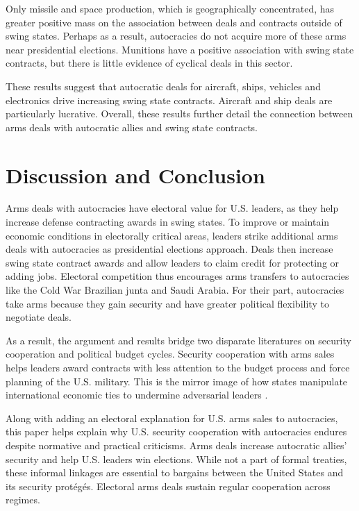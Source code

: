 \documentclass[12pt]{article}
\begin{document}
Only missile and space production, which is geographically concentrated, has greater positive mass on the association between deals and contracts outside of swing states. 
Perhaps as a result, autocracies do not acquire more of these arms near presidential elections. 
Munitions have a positive association with swing state contracts, but there is little evidence of cyclical deals in this sector. 


These results suggest that autocratic deals for aircraft, ships, vehicles and electronics drive increasing swing state contracts.
Aircraft and ship deals are particularly lucrative. 
Overall, these results further detail the connection between arms deals with autocratic allies and swing state contracts.  



\section{Discussion and Conclusion}


Arms deals with autocracies have electoral value for U.S. leaders, as they help increase defense contracting awards in swing states. 
To improve or maintain economic conditions in electorally critical areas, leaders strike additional arms deals with autocracies as presidential elections approach.
Deals then increase swing state contract awards and allow leaders to claim credit for protecting or adding jobs.
Electoral competition thus encourages arms transfers to autocracies like the Cold War Brazilian junta and Saudi Arabia.
For their part, autocracies take arms because they gain security and have greater political flexibility to negotiate deals. 


As a result, the argument and results bridge two disparate literatures on security cooperation and political budget cycles. 
Security cooperation with arms sales helps leaders award contracts with less attention to the budget process and force planning of the U.S. military.
This is the mirror image of how states manipulate international economic ties to undermine adversarial leaders \citep{ChyzhUrbatsch2021, KimMargalit2021}.


Along with adding an electoral explanation for U.S. arms sales to autocracies, this paper helps explain why U.S. security cooperation with autocracies endures despite normative and practical criticisms. 
Arms deals increase autocratic allies' security and help U.S. leaders win elections.
While not a part of formal treaties, these informal linkages are essential to bargains between the United States and its security prot{\'e}g{\'e}s.
Electoral arms deals sustain regular cooperation across regimes.
\end{document}
